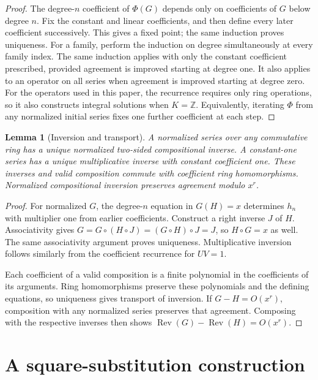 \documentclass[11pt,a4paper]{article}
\newtheorem{lemma}[theorem]{Lemma}
\theoremstyle{remark}
\newcommand{\Z}{\mathbb Z}
\newcommand{\Rev}{\operatorname{Rev}}
\begin{document}
\begin{proof}
The degree-$n$ coefficient of $\Phi(G)$ depends only on coefficients of
$G$ below degree $n$. Fix the constant and linear coefficients, and then
define every later coefficient successively. This gives a fixed point;
the same induction proves uniqueness. For a family, perform the induction
on degree simultaneously at every family index. The same induction applies with only the constant coefficient prescribed,
provided agreement is improved starting at degree one. It also applies to
an operator on all series when agreement is improved starting at degree zero.
For the operators used in this paper, the recurrence requires
only ring operations, so it also constructs integral solutions when
$K=\Z$. Equivalently, iterating $\Phi$ from any normalized initial series
fixes one further coefficient at each step.
\end{proof}

\begin{lemma}[Inversion and transport]\label{lem:inverse}
A normalized series over any commutative ring has a unique normalized
two-sided compositional inverse. A constant-one series has a unique
multiplicative inverse with constant coefficient one. These inverses and
valid composition commute with coefficient ring homomorphisms.
Normalized compositional inversion preserves agreement modulo $x^r$.
\end{lemma}

\begin{proof}
For normalized $G$, the degree-$n$ equation in $G(H)=x$ determines $h_n$
with multiplier one from earlier coefficients. Construct a right inverse
$J$ of $H$. Associativity gives
$G=G\circ(H\circ J)=(G\circ H)\circ J=J$, so $H\circ G=x$ as well.
The same associativity argument proves uniqueness. Multiplicative
inversion follows similarly from the coefficient recurrence for $UV=1$.

Each coefficient of a valid composition is a finite polynomial in the
coefficients of its arguments. Ring homomorphisms preserve these
polynomials and the defining equations, so uniqueness gives transport of
inversion. If $G-H=O(x^r)$, composition with any normalized series
preserves that agreement. Composing with the respective inverses then
shows $\Rev(G)-\Rev(H)=O(x^r)$.
\end{proof}

\section{A square-substitution construction}
\end{document}
